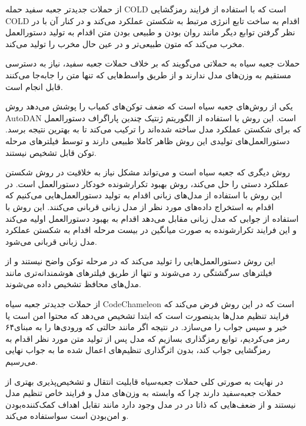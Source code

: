 از حملات جدیدتر جعبه سفید حمله COLD  است که با استفاده از فرایند رمزگشایی COLD  اقدام به ساخت تابع انرژی مرتبط به شکستن عملکرد می‌کند و در کنار آن با در نظر گرفتن توابع دیگر مانند روان بودن و طبیعی بودن متن اقدام به تولید دستورالعمل مخرب می‌کند که متون طبیعی‌تر و در عین حال مخرب را تولید می‌کند.


حملات جعبه سیاه به حملاتی می‌گویند که بر خلاف حملات جعبه سفید، نیاز به دسترسی مستقیم به وزن‌های مدل ندارند و از طریق واسط‌هایی که تنها متن را جابه‌جا می‌کنند قابل انجام است.

یکی از روش‌های جعبه سیاه است که ضعف توکن‌های کمیاب  را پوشش می‌دهد روش AutoDAN   است. این روش با استفاده از الگوریتم ژنتیک چندین پاراگراف دستورالعمل که برای شکستن عملکرد مدل ساخته شده‌اند را ترکیب می‌کند تا به بهترین نتیجه برسد. دستورالعمل‌های تولیدی این روش ظاهر کاملا طبیعی دارند و توسط فیلترهای مرحله توکن قابل تشخیص نیستند.

روش دیگری که جعبه سیاه است و می‌تواند مشکل نیاز به خلاقیت در روش شکستن عملکرد دستی را حل می‌کند، روش بهبود تکرارشونده خودکار دستورالعمل است. در این روش با استفاده از مدل‌های زبانی اقدام به تولید دستورالعمل‌هایی می‌کنیم که اقدام به استخراج داده‌های مورد نظر از مدل زبانی قربانی می‌کنند. این روش با استفاده از جوابی که مدل زبانی مقابل می‌دهد اقدام به بهبود دستورالعمل اولیه می‌کند و این فرایند تکرارشونده به صورت میانگین در بیست مرحله اقدام به شکستن عملکرد مدل زبانی قربانی می‌شود.

این روش دستورالعمل‌هایی را تولید می‌کند که در مرحله توکن واضح نیستند و از فیلترهای سرگشتگی رد می‌شوند و تنها از طریق فیلترهای هوشمندانه‌تری مانند مدل‌های محافظ تشخیص داده می‌شوند.


از حملات جدیدتر جعبه سیاه CodeChameleon  است که در این روش فرض می‌کند که فرایند تنظیم مدل‌ها بدینصورت است که ابتدا تشخیص می‌دهد که محتوا امن است یا خیر و سپس جواب را می‌سازد. در نتیجه اگر مانند حالتی که ورودی‌ها را به مبنای۶۴ رمز می‌کردیم، توابع رمزگذاری بسازیم که مدل پس از تولید متن مورد نظر اقدام به رمزگشایی جواب کند، بدون اثرگذاری تنظیم‌های اعمال شده ما به جواب نهایی می‌رسیم.

در نهایت به صورتی کلی حملات جعبه‌سیاه قابلیت انتقال و تشخیص‌پذیری بهتری از حملات جعبه‌سفید دارند چرا که وابسته به وزن‌های مدل و فرایند خاص تنظیم مدل نیستند و از ضعف‌هایی که ذاتا در در مدل وجود دارد مانند تقابل اهداف کمک‌کننده‌بودن و امن‌بودن است سواستفاده می‌کند. 

